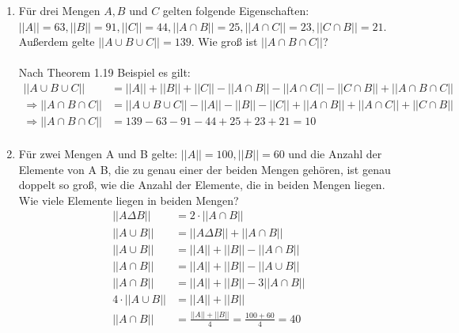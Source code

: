 \begin{enumerate}[label=(\alph*)]
        \item Für drei Mengen $A, B$ und $C$ gelten folgende Eigenschaften: 
        $||A|| = 63, ||B|| = 91, ||C|| = 44, ||A\cap B|| = 25, ||A\cap C|| = 23, ||C \cap B|| = 21$. 
        Außerdem gelte $||A\cup B\cup C|| = 139$. Wie groß ist $||A \cap B \cap C||$?\\\\
        Nach Theorem 1.19 Beispiel es gilt:
        \begin{align*}
	        ||A\cup B\cup C|| &= ||A||+||B||+||C||-||A\cap B||-||A\cap C||-||C \cap B||+||A \cap B \cap C||\\
	        \Rightarrow ||A \cap B \cap C|| &= ||A\cup B\cup C||-||A||-||B||-||C||+||A\cap B||+||A\cap C||+||C \cap B||\\
	        \Rightarrow ||A \cap B \cap C|| &= 139 - 63 - 91 - 44 + 25 + 23 + 21 = 10 \\
        \end{align*}

        \item Für zwei Mengen A und B gelte: $||A|| = 100, ||B|| = 60$ und die Anzahl 
        der Elemente von A  B, die zu genau einer der beiden Mengen gehören, ist genau 
        doppelt so groß, wie die Anzahl der Elemente, die in beiden Mengen liegen. Wie viele Elemente liegen in beiden Mengen?
        \begin{align*}
        	||A \Delta B|| &= 2 \cdot ||A \cap B|| \\
        	||A \cup B || &= ||A \Delta B|| + ||A \cap B|| \\
        	||A \cup B || &= ||A|| + ||B|| - ||A \cap B|| \\
        	||A \cap B || &= ||A|| + ||B|| - ||A \cup B|| \\
        	||A \cap B || &= ||A|| + ||B|| - 3||A \cap B|| \\
        	4 \cdot ||A \cup B || &= ||A|| + ||B|| \\
        	||A \cap B|| &= \frac{||A||+||B||}{4}= \frac{100 + 60}{4} = 40 
        \end{align*}
        

\end{enumerate}
